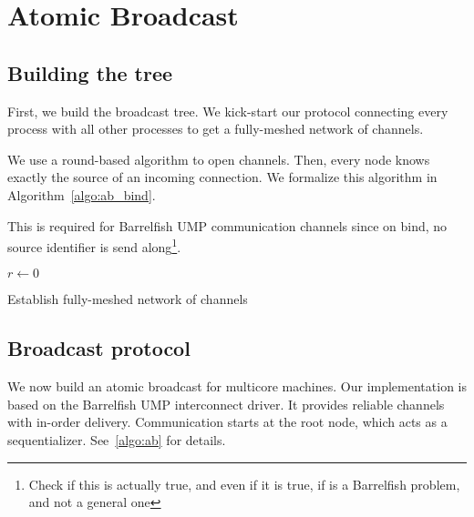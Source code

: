 \documentclass{article}
\begin{document}
\section{Atomic Broadcast}

\subsection{Building the tree}

First, we build the broadcast tree. We kick-start our protocol
connecting every process with all other processes to get a
fully-meshed network of channels.

We use a round-based algorithm to open channels. Then, every node
knows exactly the source of an incoming connection. We formalize this
algorithm in Algorithm~\ref{algo:ab_bind}.

This is required for Barrelfish UMP communication channels since on
bind, no source identifier is send along\footnote{Check if this is
  actually true, and even if it is true, if is a Barrelfish problem,
  and not a general one}.

\begin{algorithm}[H]
  \BlankLine
  \BlankLine
  $r \leftarrow 0$\;
  \caption{Establish fully-meshed network of channels}
  \label{algo:ab_bind}
\end{algorithm}


\subsection{Broadcast protocol}

We now build an atomic broadcast for multicore machines. Our
implementation is based on the Barrelfish UMP interconnect driver. It
provides reliable channels with in-order delivery. Communication
starts at the root node, which acts as a
sequentializer. See~\ref{algo:ab} for details.
\end{document}
